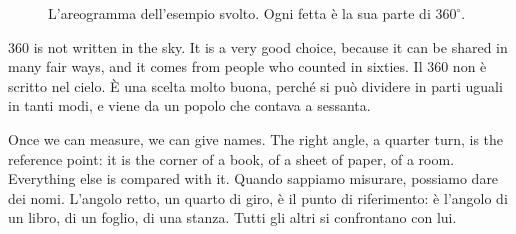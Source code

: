 \begin{figure}[htbp]
\centering
%
      {L'areogramma dell'esempio svolto. Ogni fetta è la sua parte di $360^\circ$.}
\label{fig:pie}
\end{figure}

\begin{keyidea}{}{}
360 is not written in the sky. It is a very good choice, because it can be shared in many fair ways, and it comes from people who counted in sixties.
\tcblower
Il 360 non è scritto nel cielo. È una scelta molto buona, perché si può dividere in parti uguali in tanti modi, e viene da un popolo che contava a sessanta.
\end{keyidea}

\label{sec:types}
\begin{bi}
Once we can measure, we can give names. The right angle, a quarter turn, is the reference point: it is the corner of a book, of a sheet of paper, of a room. Everything else is compared with it.
\IT
Quando sappiamo misurare, possiamo dare dei nomi. L'angolo retto, un quarto di giro, è il punto di riferimento: è l'angolo di un libro, di un foglio, di una stanza. Tutti gli altri si confrontano con lui.
\end{bi}

